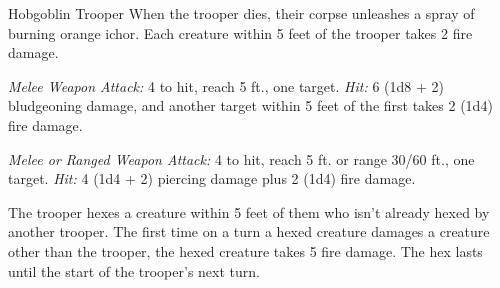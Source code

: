 \documentclass[10pt,a4paper,twoside,bg=print,twocolumn,openany,nodeprecatedcode]{dndbook}
\begin{document}
\begin{DndMonster}[float=t]{Hobgoblin Trooper}
\DndMonsterBasics[
armor-class = {16 (\textit{ring mail})},
hit-points = {\DndDice{4d8}},
speed = {30 ft.}
]
\DndMonsterAbilityScores[
 str = 14,
 dex = 12,
 con = 11,
 int = 10,
 wis = 10,
 cha = 10
]
\DndMonsterDetails[
skills = {Athletics +4, Perception +2},
damage-resistances = {fire},
senses = {darkvision 60 ft., passive perception 12},
languages = {Common, Goblin, Infernal},
challenge = 1/2,
]
When the trooper dies, their corpse unleashes a spray of burning orange ichor. Each creature within 5 feet of the trooper takes 2 fire damage.

\textsl{Melee Weapon Attack:} 4 to hit, reach 5 ft., one target. \textsl{Hit:} 6 (1d8 + 2) bludgeoning damage, and another target within 5 feet of the first takes 2 (1d4) fire damage.

\textsl{Melee or Ranged Weapon Attack:} 4 to hit, reach 5 ft. or range 30/60 ft., one target. \textsl{Hit:} 4 (1d4 + 2) piercing damage plus 2 (1d4) fire damage.

The trooper hexes a creature within 5 feet of them who isn't already hexed by another trooper. The first time on a turn a hexed creature damages a creature other than the trooper, the hexed creature takes 5 fire damage. The hex lasts until the start of the trooper's next turn.

\end{DndMonster}
\end{document}
